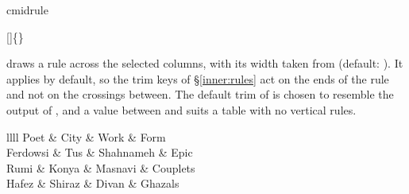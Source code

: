 \begin{codedescribe}[
        code,
        new=2021L,
        update=2021N
    ]{cmidrule}
    \begin{codesyntax}
        []\{\}
    \end{codesyntax}
     draws a rule across the selected columns, with its width taken from \tsobj[code]{\cmidrulewidth} (default: \val{.03em}). It applies  by default, so the trim keys  of \S\ref{inner:rules} act on the ends of the rule and not on the crossings between. The default trim of  is chosen to resemble the output of , and a value between  and  suits a table with no vertical rules.

    \begin{codestore}[st=lib:booktabs:cmidrule]
        \begin{tblr}{llll}
            \toprule
            Poet     & City   & Work      & Form     \\
             
            Ferdowsi & Tus    & Shahnameh & Epic     \\
             
            Rumi     & Konya  & Masnavi   & Couplets \\
             
            Hafez    & Shiraz & Divan     & Ghazals  \\
            \bottomrule
        \end{tblr}\end{codestore}
    \begin{center}
    \end{center}
\end{codedescribe}

